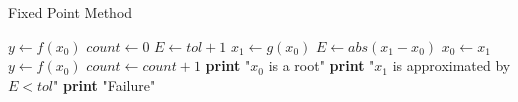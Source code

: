 \documentclass{article}
\begin{document}
  \begin{algorithm}
    \caption{Fixed Point Method}
    \begin{algorithmic}[1]
        \State $y \gets f(x_{0})$
        \State $count \gets 0$
        \State $E \gets tol + 1$
          \State $x_{1} \gets g(x_{0})$
          \State $E \gets abs(x_{1} - x_{0})$
          \State $x_{0} \gets x_{1}$
          \State $y \gets f(x_{0})$
          \State $count \gets count + 1$
        \EndWhile
          \State \textbf{print} "$x_{0}$ is a root"
          \State \textbf{print} "$x_{1}$ is approximated by $E < tol$"
        \Else
          \State \textbf{print} "Failure"
        \EndIf
      \EndProcedure
    \end{algorithmic}
  \end{algorithm}
\end{document}
